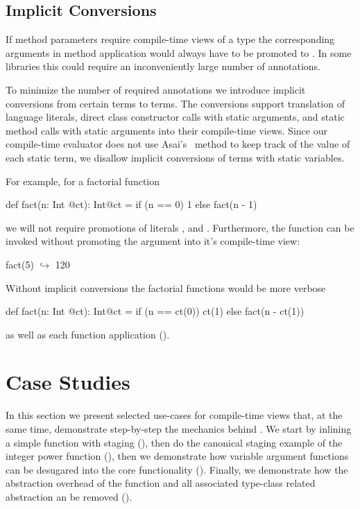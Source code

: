 \subsection{Implicit Conversions}
\label{sct:implicits}

If method parameters require compile-time views of a type the corresponding arguments
 in method application would always have to be promoted to .
 In some libraries this could require an inconveniently large number
 of annotations.

To minimize the number of required annotations we introduce implicit conversions from certain  terms to  terms.
 The conversions support translation of language literals, direct class constructor calls with static arguments, and static method
 calls with static arguments into their compile-time views. Since our compile-time evaluator does
 not use Asai's~\cite{asai2002binding,sumii2001hybrid} method to keep track of
 the value of each static term, we disallow implicit conversions of terms with static variables.

For example, for a factorial function \begin{lstparagraph}
def fact(n: Int @ct): Int@ct =
  if (n == 0) 1 else fact(n - 1)
 \end{lstparagraph} we will not require promotions of literals , and . Furthermore,
 the function can be invoked without promoting the argument into it's compile-time view:\begin{lstparagraph}
fact(5)
  $\hookrightarrow$ 120
 \end{lstparagraph}

Without implicit conversions the factorial functions would be more verbose \begin{lstparagraph}
def fact(n: Int @ct): Int@ct =
  if (n == ct(0)) ct(1) else fact(n - ct(1))
 \end{lstparagraph} as well as each function application ().




\section{Case Studies}
\label{sct:case-studies}

In this section we present selected use-cases for compile-time views that, at the
same time, demonstrate step-by-step the mechanics behind \tool. We start by inlining a simple function with staging
(), then do the canonical staging  example of the integer power function
(), then we demonstrate how variable argument functions can
be  desugared into the core functionality (). Finally, we
demonstrate how the abstraction overhead of the  function and all
associated type-class related abstraction an be removed ().

